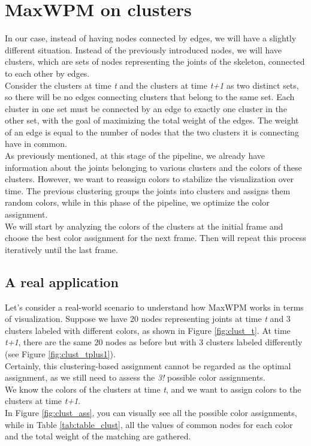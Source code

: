 \section{MaxWPM on clusters}
In our case, instead of having nodes connected by edges, we will have a slightly different situation.
Instead of the previously introduced nodes, we will have clusters, which are sets of nodes representing the joints of the skeleton, connected to each other by edges.\\  
Consider the clusters at time \textit{t} and the clusters at time \textit{t+1} as two distinct sets, so there will be no edges connecting clusters that belong to the same set.
Each cluster in one set must be connected by an edge to exactly one cluster in the other set, with the goal of maximizing the total weight of the edges.
The weight of an edge is equal to the number of nodes that the two clusters it is connecting have in common.\\
As previously mentioned, at this stage of the pipeline, we already have information about the joints belonging to various clusters and the colors of these clusters. However, we want to reassign colors to stabilize the visualization over time.
The previous clustering groups the joints into clusters and assigns them random colors, while in this phase of the pipeline, we optimize the color assignment.\\
We will start by analyzing the colors of the clusters at the initial frame and choose the best color assignment for the next frame.
Then will repeat this process iteratively until the last frame.


\subsection{A real application}
Let's consider a real-world scenario to understand how MaxWPM works in terms of visualization.
Suppose we have 20 nodes representing joints at time \textit{t} and 3 clusters labeled with different colors, as shown in Figure \ref{fig:clust_t}.
At time \textit{t+1}, there are the same 20 nodes as before but with 3 clusters labeled differently (see Figure \ref{fig:clust_tplus1}). \\
Certainly, this clustering-based assignment cannot be regarded as the optimal assignment, as we still need to assess the \textit{3!} possible color assignments. \\
We know the colors of the clusters at time \textit{t}, and we want to assign colors to the clusters at time \textit{t+1}. \\
In Figure \ref{fig:clust_ass}, you can visually see all the possible color assignments, while in Table \ref{tab:table_clust}, all the values of common nodes for each color and the total weight of the matching are gathered.


